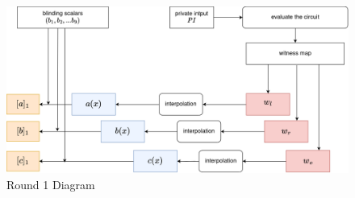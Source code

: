 \begin{figure}[H]
    \label{fig:round1}
    \centering
    \includegraphics[width=1\linewidth]{round-figures/round1/round1.drawio.png}
    \caption{Round 1 Diagram}
\end{figure}







